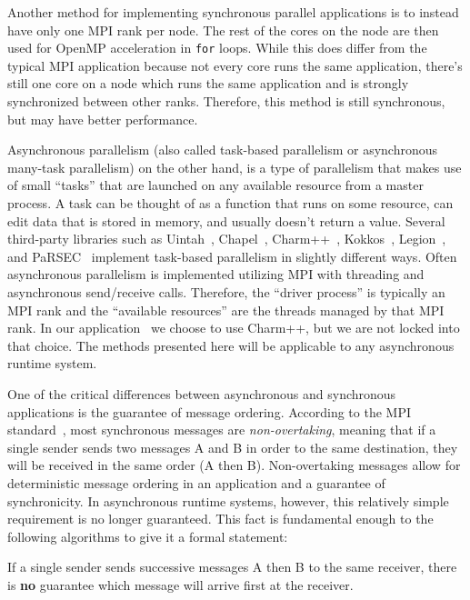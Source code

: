\begin{bibunit}[unsrtnat]
Another method for implementing synchronous parallel applications is to instead
have only one MPI rank per node. The rest of the cores on the node are then used
for OpenMP acceleration in \texttt{for} loops. While this does differ from the
typical MPI application because not every core runs the same application,
there's still one core on a node which runs the same application and is strongly
synchronized between other ranks. Therefore, this method is still synchronous,
but may have better performance.

Asynchronous parallelism (also called task-based parallelism or asynchronous
many-task parallelism) on the other hand, is a type of parallelism that makes
use of small ``tasks'' that are launched on any available resource from a master
process. A task can be thought of as a function that runs on some resource, can
edit data that is stored in memory, and usually doesn't return a value. Several
third-party libraries such as Uintah~\cite{10.5555/822085.823309},
Chapel~\cite{10.5555/2753024.2753030},
Charm++~\cite{laxmikant_kale_2020_3972617}, Kokkos~\cite{kokkos},
Legion~\cite{7529975}, and
PaRSEC~\cite{chevalier2019protocolasynchronousreliablesecure} implement
task-based parallelism in slightly different ways. Often asynchronous
parallelism is implemented utilizing MPI with threading and asynchronous
send/receive calls. Therefore, the ``driver process'' is typically an MPI rank
and the ``available resources'' are the threads managed by that MPI rank. In our
application \spectre~we choose to use Charm++, but we are not locked into that
choice. The methods presented here will be applicable to any asynchronous
runtime system.

One of the critical differences between asynchronous and synchronous
applications is the guarantee of message ordering. According to the MPI
standard~\cite{mpi50}, most synchronous messages are \textit{non-overtaking},
meaning that if a single sender sends two messages A and B in order to the same
destination, they will be received in the same order (A then B). Non-overtaking
messages allow for deterministic message ordering in an application and a
guarantee of synchronicity. In asynchronous runtime systems, however, this
relatively simple requirement is no longer guaranteed. This fact is fundamental
enough to the following algorithms to give it a formal statement:

\begin{statement}
  \label{statement:a_before_b}
  If a single sender sends successive messages A then B to the same receiver,
  there is \textbf{no} guarantee which message will arrive first at the
  receiver.
\end{statement}


\end{bibunit}
